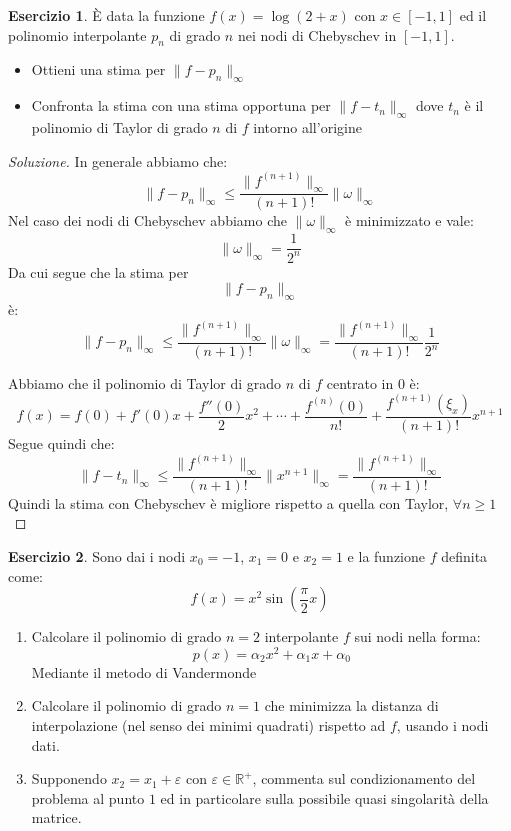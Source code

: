 \documentclass[11pt,a4paper,twoside]{article}
\newcommand{\vareps}{\varepsilon}
\theoremstyle{definition}
\newtheorem*{ese}{Esercizio}
\newenvironment{sol}
	{\renewcommand\qedsymbol{$\blacksquare$}\begin{proof}[Soluzione]}
	{\end{proof}}
\begin{document}
\begin{ese}
	È data la funzione $f(x) = \log (2+x)$ con $x \in [-1,1]$ ed il polinomio interpolante $p_n$ di grado $n$ nei nodi di Chebyschev in $[-1,1]$.
	\begin{itemize}
		\item Ottieni una stima per $\|f-p_n\|_\infty$
		\item Confronta la stima con una stima opportuna per $\|f-t_n\|_\infty$ dove $t_n$ è il polinomio di Taylor di grado $n$ di $f$ intorno all'origine
	\end{itemize}
\end{ese}

\begin{sol}
	 In generale abbiamo che:
	\[ \|f-p_n\|_\infty \leq \frac{\|f^{(n+1)}\|_\infty}{(n+1)!}\|\omega\|_\infty \]
	Nel caso dei nodi di Chebyschev abbiamo che $\|\omega\|_\infty$ è minimizzato e vale:
	\[ \|\omega\|_\infty = \frac 1{2^n} \]
	Da cui segue che la stima per \[ \| f-p_n\|_\infty \] è:
	\[ \|f-p_n\|_\infty \leq \frac{\|f^{(n+1)}\|_\infty}{(n+1)!}\|\omega\|_\infty = \frac {\|f^{(n+1)}\|_\infty}{(n+1)!} \frac 1{2^n}\]

	 Abbiamo che il polinomio di Taylor di grado $n$ di $f$ centrato in $0$ è:
	\[ f(x)= f(0) + f'(0)x + \frac{f''(0)}{2}x^2 + \cdots + \frac{f^{(n)}(0)}{n!} + \frac{f^{(n+1)}(\xi_x)}{(n+1)!} x^{n+1}\]
	Segue quindi che:
	\[ \|f-t_n\|_\infty \leq \frac{\|f^{(n+1)}\|_\infty}{(n+1)!}\|x^{n+1}\|_\infty = \frac{\|f^{(n+1)}\|_\infty}{(n+1)!}  \]
	Quindi la stima con Chebyschev è migliore rispetto a quella con Taylor, $\forall n \geq 1$
\end{sol}

\begin{ese}
	Sono dai i nodi $x_0 = -1$, $x_1 = 0$ e $x_2 = 1$ e la funzione $f$ definita come:
	\[ f(x) = x^2 \sin \left( \frac \pi 2 x \right) \]
	\begin{enumerate}
		\item Calcolare il polinomio di grado $n=2$ interpolante $f$ sui nodi nella forma:
			\[ p(x) = \alpha_2 x^2 + \alpha_1 x + \alpha_0 \]
			Mediante il metodo di Vandermonde
		\item Calcolare il polinomio di grado $n = 1$ che minimizza la distanza di interpolazione (nel senso dei minimi quadrati) rispetto ad $f$, usando i nodi dati.
		\item Supponendo $x_2 = x_1 + \vareps$ con $\vareps \in \mathbb R^+$, commenta sul condizionamento del problema al punto $1$ ed in particolare sulla possibile quasi singolarità della matrice.
	\end{enumerate}
\end{ese}
\end{document}
